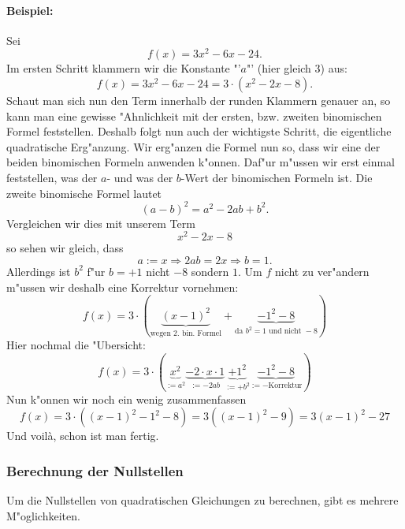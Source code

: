 \paragraph{Beispiel:}
Sei 
\begin{equation*}
f(x) = 3x^2 - 6x - 24.
\end{equation*}
Im ersten Schritt klammern wir die Konstante "'$a$"' (hier gleich $3$) aus:
\begin{equation*}
f(x) = 3x^2 - 6x - 24= 3 \cdot (x^2-2x-8).
\end{equation*}
Schaut man sich nun den Term innerhalb der runden Klammern genauer an, so kann man eine gewisse "Ahnlichkeit mit der ersten, bzw. zweiten binomischen Formel feststellen. Deshalb folgt nun auch der wichtigste Schritt, die eigentliche quadratische Erg"anzung. Wir erg"anzen die Formel nun so, dass wir eine der beiden binomischen Formeln anwenden k"onnen. Daf"ur m"ussen wir erst einmal feststellen, was der $a$- und was der $b$-Wert der binomischen Formeln ist. Die zweite binomische Formel lautet 
\begin{equation*}
(a-b)^2=a^2-2ab+b^2.
\end{equation*}
Vergleichen wir dies mit unserem Term 
\begin{equation*}
x^2-2x-8
\end{equation*}
so sehen wir gleich, dass
\begin{equation*}
a := x \Rightarrow 2ab = 2x \Rightarrow b = 1.
\end{equation*}
Allerdings ist $b^2$ f"ur $b = +1$ nicht $-8$ sondern $1$. Um $f$ nicht zu ver"andern m"ussen wir deshalb eine Korrektur vornehmen:
\begin{equation*}
f(x) = 3 \cdot \left(  \underbrace{(x-1)^2}_{\text{wegen 2. bin. Formel}} + \underbrace{-1^2 - 8}_{\text{da } b^2 = 1 \text{ und nicht } -8 } \right)
\end{equation*}
Hier nochmal die "Ubersicht:
\begin{equation*}
f(x) = 3 \cdot \left(  \underbrace{x^2}_{:=a^2} \underbrace{- 2 \cdot x \cdot 1}_{:= -2ab} \underbrace{+ 1^2}_{:= + b^2} \underbrace{- 1^2 -8}_{:=-\text{Korrektur}} \right)
\end{equation*} 
Nun k"onnen wir noch ein wenig zusammenfassen
\begin{equation*}
f(x) = 3 \cdot ((x-1)^2-1^2-8) = 3((x-1)^2-9) = 3(x-1)^2-27
\end{equation*}
Und voil\`a, schon ist man fertig.

\subsubsection{Berechnung der Nullstellen} \label{sec:quadnullstellen}
Um die Nullstellen von quadratischen Gleichungen zu berechnen, gibt es mehrere M"oglichkeiten.

